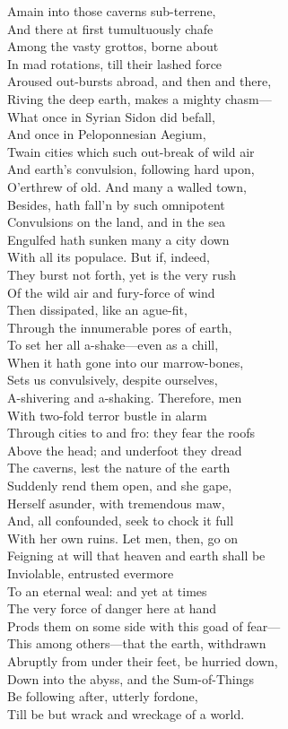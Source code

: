 Amain into those caverns sub-terrene,\\
And there at first tumultuously chafe\\
Among the vasty grottos, borne about\\
In mad rotations, till their lashed force\\
Aroused out-bursts abroad, and then and there,\\
Riving the deep earth, makes a mighty chasm—\\
What once in Syrian Sidon did befall,\\
And once in Peloponnesian Aegium,\\
Twain cities which such out-break of wild air\\
And earth's convulsion, following hard upon,\\
O'erthrew of old. And many a walled town,\\
Besides, hath fall'n by such omnipotent\\
Convulsions on the land, and in the sea\\
Engulfed hath sunken many a city down\\
With all its populace. But if, indeed,\\
They burst not forth, yet is the very rush\\
Of the wild air and fury-force of wind\\
Then dissipated, like an ague-fit,\\
Through the innumerable pores of earth,\\
To set her all a-shake—even as a chill,\\
When it hath gone into our marrow-bones,\\
Sets us convulsively, despite ourselves,\\
A-shivering and a-shaking. Therefore, men\\
With two-fold terror bustle in alarm\\
Through cities to and fro: they fear the roofs\\
Above the head; and underfoot they dread\\
The caverns, lest the nature of the earth\\
Suddenly rend them open, and she gape,\\
Herself asunder, with tremendous maw,\\
And, all confounded, seek to chock it full\\
With her own ruins. Let men, then, go on\\
Feigning at will that heaven and earth shall be\\
Inviolable, entrusted evermore\\
To an eternal weal: and yet at times\\
The very force of danger here at hand\\
Prods them on some side with this goad of fear—\\
This among others—that the earth, withdrawn\\
Abruptly from under their feet, be hurried down,\\
Down into the abyss, and the Sum-of-Things\\
Be following after, utterly fordone,\\
Till be but wrack and wreckage of a world.

